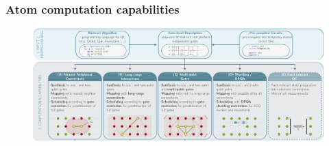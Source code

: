 \documentclass[18 pt]{beamer}
\begin{document}
\begin{frame}
    \frametitle{Atom computation capabilities}
    \begin{figure}
        \includegraphics[width=\textwidth]{ca.png}
    \end{figure}
\end{frame}
\end{document}
